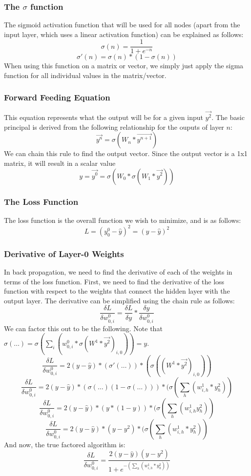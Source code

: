 \documentclass[10pt]{article}
\begin{document}
\subsubsection{The $\sigma$ function}
The sigmoid activation function that will be used for all nodes (apart from the input layer, which uses a linear activation function) can be explained as follows:
$$\sigma(n) = \frac{1}{1 + e^{-n}}$$
$$\sigma'(n) = \sigma(n) * (1 - \sigma(n))$$
When using this function on a matrix or vector, we simply just apply the sigma function for all individual values in the matrix/vector. 

\subsubsection{Forward Feeding Equation}
This equation represents what the output will be for a given input $\vec{y^2}$. The basic principal is derived from the following relationship for the ouputs of layer $n$:
$$\vec{y^n} = \sigma(W_{n} * \vec{y^{n+1}})$$
We can chain this rule to find the output vector. Since the output vector is a 1x1 matrix, it will result in a scalar value
$$y = \vec{y^0} = \sigma(W_0 * \sigma(W_1 * \vec{y^2}))$$
\subsubsection{The Loss Function}
The loss function is the overall function we wish to minimize, and is as follows:
$$L = (y^0_0 - \hat{y})^2 = (y - \hat{y})^2$$

\subsubsection{Derivative of Layer-0 Weights}
In back propagation, we need to find the derivative of each of the weights in terms of the loss function. First, we need to find the derivative of the loss function with respect to the weights that connect the hidden layer with the output layer. The derivative can be simplified using the chain rule as follows:
$$\frac{\delta L}{\delta w^0_{0,i}} = \frac{\delta L}{\delta y} * \frac{\delta y}{\delta w^0_{0,i}}$$
We can factor this out to be the following. Note that $\sigma(\ldots) = \sigma(\sum_i{(w^0_{0,i} * \sigma(W^1 * \vec{y^2})_{i,0})}) = y$.
$$\frac{\delta L}{\delta w^0_{0,i}} = 2(y - \hat{y}) * (\sigma'(\ldots)) * (\sigma((W^1 * \vec{y^2})_{i,0}))$$
$$\frac{\delta L}{\delta w^0_{0,i}} = 2(y - \hat{y}) * (\sigma(\ldots)(1 - \sigma(\ldots))) * (\sigma(\sum_h{(w^1_{i,h}* y^2_{h})})$$
$$\frac{\delta L}{\delta w^0_{0,i}} = 2(y - \hat{y}) * (y * (1 - y)) * (\sigma(\sum_h{(w^1_{i,h} y^2_{h})})$$
$$\frac{\delta L}{\delta w^0_{0,i}} = 2(y - \hat{y}) * (y - y^2) *  (\sigma(\sum_h^{}{(w^1_{i,h} *y^2_{h})})$$
And now, the true factored algorithm is:
$$\frac{\delta L}{\delta w^0_{0,i}} = \frac{2(y - \hat{y})(y - y^2)}{1 + e^{-(\sum_h^{}{(w^1_{i,h} *y^2_{h})})}}$$
\end{document}
